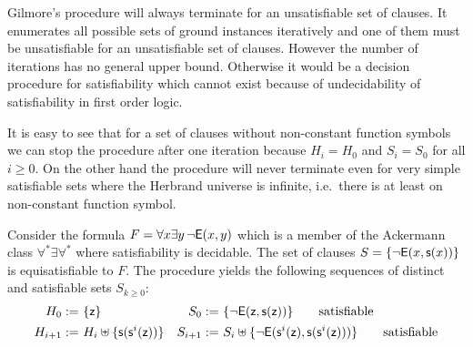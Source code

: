 Gilmore's procedure will always terminate for an unsatisfiable set of clauses.
It enumerates all possible sets of ground instances iteratively
and one of them must be unsatisfiable for an unsatisfiable set of clauses. 
However the number of iterations has no general upper bound. 
Otherwise it would be a decision procedure for satisfiability
which cannot exist because of undecidability of satisfiability in first order logic.

It is easy to see that for a set of clauses without non-constant function symbols
we can stop the procedure after one iteration because $H_i = H_0$ and $S_i = S_0$ for all $i\geq0$.
%
On the other hand the procedure will never terminate 
even for very simple satisfiable sets where the Herbrand universe is infinite, 
i.e.~there is at least on non-constant function symbol.

\begin{example}
	Consider the formula 
	$F = \forall x\exists y\,\lnot{\mathsf{E}}(x,y)$
	which is a member of the Ackermann class $\forall^*\exists\forall^*$ 
	where satisfiability is decidable.
	The set of clauses 
	$S = \{ \lnot{\mathsf{E}}(x,{\mathsf s}(x)) \}$ is equisatisfiable to $F$.
	The procedure yields the following sequences of distinct and satisfiable sets $S_{k\geq0}$:
	\begin{align*}
	H_{0} :=&\  \{ {\mathsf z} \} 
	&
	S_{0} :=&\ \{ \lnot{\mathsf{E}}({\mathsf z},{\mathsf s}({\mathsf z}))
	\}
	\tag*{satisfiable}
	\\
	H_{i+1} :=&\ H_i \uplus \{ {\mathsf s}({\mathsf s}^{i}({\mathsf z})) \} 
	&
	S_{i+1} :=&\ S_i \uplus 
	\{
	\lnot{\mathsf{E}}({\mathsf s}^i({\mathsf z}),{\mathsf s}({\mathsf s}^i({\mathsf z})))
	\}
	\tag*{satisfiable}
	\end{align*}
\end{example}


\begin{example}\label{ex:simplesat}
\end{example}

 

